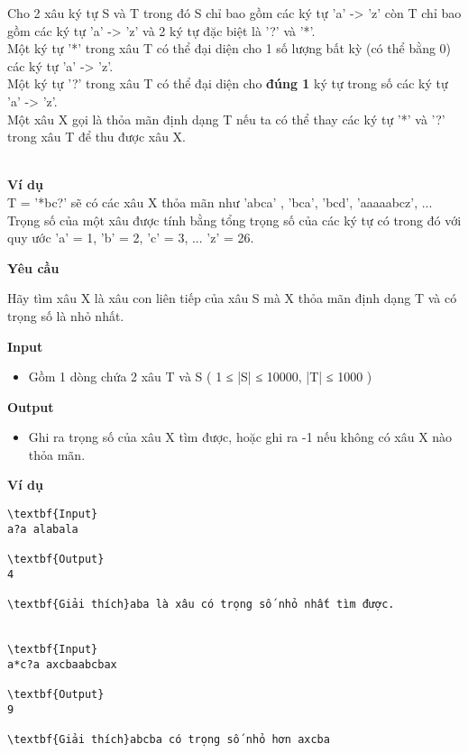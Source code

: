 

Cho 2 xâu ký tự S và T trong đó S chỉ bao gồm các ký tự 'a' -> 'z' còn T chỉ bao gồm các ký tự 'a' -> 'z' và 2 ký tự đặc biệt là '?' và '*'.
\\Một ký tự '*' trong xâu T có thể đại diện cho 1 số lượng bất kỳ (có thể bằng 0) các ký tự 'a' -> 'z'.
\\Một ký tự '?' trong xâu T có thể đại diện cho \textbf{ đúng 1 } ký tự trong số các ký tự 'a' -> 'z'.
\\Một xâu X gọi là thỏa mãn định dạng T nếu ta có thể thay các ký tự '*' và '?' trong xâu T để thu được xâu X.


\\\textbf{Ví dụ}
\\T = '*bc?' sẽ có các xâu X thỏa mãn như 'abca' , 'bca', 'bcd', 'aaaaabcz', ...
\\Trọng số của một xâu được tính bằng tổng trọng số của các ký tự có trong đó với quy ước 'a' = 1, 'b' = 2, 'c' = 3, ... 'z' = 26.

\textbf{Yêu cầu}

Hãy tìm xâu X là xâu con liên tiếp của xâu S mà X thỏa mãn định dạng T và có trọng số là nhỏ nhất.

\textbf{Input }
\begin{itemize}
	\item 

Gồm 1 dòng chứa 2 xâu T và S ( 1 ≤ |S| ≤ 10000, |T| ≤ 1000 )
\end{itemize}

\textbf{Output }
\begin{itemize}
	\item 

Ghi ra trọng số của xâu X tìm được, hoặc ghi ra -1 nếu không có xâu X nào thỏa mãn.
\end{itemize}

\textbf{Ví dụ}
\begin{verbatim}
\textbf{Input}
a?a alabala

\textbf{Output}
4

\textbf{Giải thích}aba là xâu có trọng số nhỏ nhất tìm được.


\textbf{Input}
a*c?a axcbaabcbax

\textbf{Output}
9

\textbf{Giải thích}abcba có trọng số nhỏ hơn axcba\end{verbatim}
